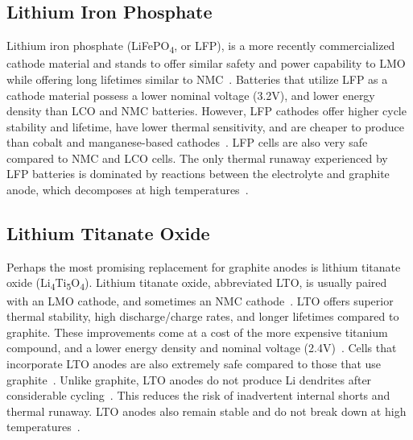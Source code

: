 \subsection{Lithium Iron Phosphate}
Lithium iron phosphate  (LiFePO\textsubscript{4}, or LFP), is a more recently commercialized cathode material and stands to offer similar safety and power capability to LMO while offering long lifetimes similar to NMC~\cite{preger2020degradation, nitta2015li}.
Batteries that utilize LFP as a cathode material possess a lower nominal voltage (3.2\si{\volt}), and lower energy density than LCO and NMC batteries. However, LFP 
cathodes offer higher cycle stability and lifetime, have lower thermal sensitivity, and are cheaper to produce than cobalt and manganese-based cathodes~\cite{doughty2012general,nitta2015li,preger2020degradation}. LFP cells are also very safe compared to NMC and LCO cells. The only thermal runaway experienced by LFP batteries is dominated by reactions between the electrolyte and graphite anode, which decomposes at high temperatures~\cite{doughty2012general}. 

\subsection{Lithium Titanate Oxide}
Perhaps the most promising replacement for graphite anodes is lithium titanate oxide (Li\textsubscript{4}Ti\textsubscript{5}O\textsubscript{4}).
Lithium titanate oxide, abbreviated LTO, is usually paired with an LMO cathode, and sometimes an NMC cathode~\cite{nitta2015li, belharouakElectrochemistry11, sandhya2014lithium}. LTO offers superior thermal stability, high discharge/charge rates, and longer lifetimes compared to graphite. These improvements come at a cost of the more expensive titanium compound, and a lower energy density and nominal voltage (2.4\si{\volt})~\cite{nitta2015li,sandhya2014lithium}. Cells that incorporate LTO anodes are also extremely safe compared to those that use graphite~\cite{nitta2015li, belharouakElectrochemistry11, sandhya2014lithium}. Unlike graphite, LTO anodes do not produce Li dendrites after considerable cycling~\cite{nitta2015li}. This reduces the risk of inadvertent internal shorts and thermal runaway. LTO anodes also remain stable and do not break down at high temperatures~\cite{belharouakElectrochemistry11}.


